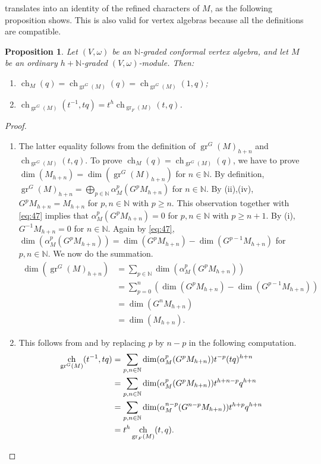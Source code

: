 \documentclass[a4paper, 12pt, reqno]{amsart}
\newtheorem{proposition}[theorem]{Proposition}
\theoremstyle{remark}
\DeclareMathOperator{\gr}{gr}
\DeclareMathOperator{\ch}{ch}
\begin{document}
 translates into an identity of the refined characters of $M$, as the following proposition shows.
This is also valid for vertex algebras because all the definitions are compatible.

\begin{proposition}
  \label{prp:21}
  Let $(V, \omega)$ be an $\mathbb{N}$-graded conformal vertex algebra, and let $M$ be an ordinary $h + \mathbb{N}$-graded $(V, \omega)$-module.
  Then:
  \begin{enumerate}
  \item $\ch_M(q) = \ch_{\gr^G(M)}(q) = \ch_{\gr^G(M)}(1, q)$;
  \item $\ch_{\gr^G(M)}(t^{-1}, tq) = t^h\ch_{\gr_F(M)}(t, q)$.
  \end{enumerate}
\end{proposition}

\begin{proof}\leavevmode
  \begin{enumerate}
  \item The latter equality follows from the definition of $\gr^G(M)_{h + n}$ and $\ch_{\gr^G(M)}(t, q)$.
    To prove $\ch_M(q) = \ch_{\gr^G(M)}(q)$, we have to prove $\dim(M_{h + n}) = \dim(\gr^G(M)_{h + n})$ for $n \in \mathbb{N}$.
    By definition, $\gr^G(M)_{h + n} = \bigoplus_{p \in \mathbb{N}}\alpha_M^p(G^pM_{h + n})$ for $n \in \mathbb{N}$.
    By (ii),(iv), $G^pM_{h + n} = M_{h + n}$ for $p, n \in \mathbb{N}$ with $p \ge n$.
    This observation together with \eqref{eq:47} implies that $\alpha_M^p(G^pM_{h + n}) = 0$ for $p, n \in \mathbb{N}$ with $p \ge n + 1$.
    By (i), $G^{-1}M_{h + n} = 0$ for $n \in \mathbb{N}$.
    Again by \eqref{eq:47}, $\dim(\alpha_M^p(G^pM_{h + n})) = \dim(G^pM_{h + n}) - \dim(G^{p - 1}M_{h + n})$ for $p, n \in \mathbb{N}$.
    We now do the summation.
    \begin{align*}
      \dim(\gr^G(M)_{h + n}) &= \sum_{p \in \mathbb{N}}\dim(\alpha_M^p(G^pM_{h + n})) \\
                             &= \sum_{p = 0}^n(\dim(G^pM_{h + n}) - \dim(G^{p - 1}M_{h + n})) \\
                             &= \dim(G^nM_{h + n}) \\
                             &= \dim(M_{h + n}).
    \end{align*}
  \item This follows from  and by replacing $p$ by $n - p$ in the following computation.
    \begin{align*}
      \ch_{\gr^G(M)}(t^{-1}, tq) &= \sum_{p, n \in \mathbb{N}}\dim(\alpha^p_M(G^pM_{h + n}))t^{-p}(tq)^{h + n} \\
                                 &= \sum_{p, n \in \mathbb{N}}\dim(\alpha^p_M(G^pM_{h + n}))t^{h + n - p}q^{h + n} \\
                                 &= \sum_{p, n \in \mathbb{N}}\dim(\alpha^{n - p}_M(G^{n - p}M_{h + n}))t^{h + p}q^{h + n} \\
                                 &= t^h\ch_{\gr_F(M)}(t, q). \qedhere
    \end{align*}
  \end{enumerate}
\end{proof}
\end{document}
